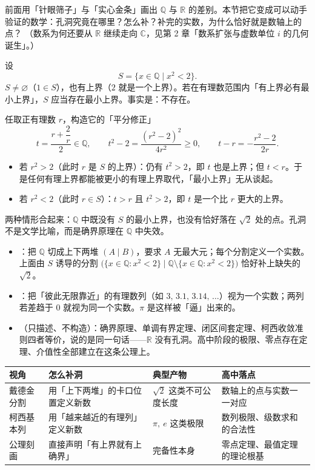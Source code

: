前面用「针眼筛子」与「实心金条」画出 $\mathbb{Q}$ 与 $\mathbb{R}$ 的差别。本节把它变成可以动手验证的数学：孔洞究竟在哪里？怎么补？补完的实数，为什么恰好就是数轴上的点？
（数系为何还要从 $\mathbb{R}$ 继续走向 $\mathbb{C}$，见第 2 章「数系扩张与虚数单位 $i$ 的几何诞生」。）

设
\[
  S=\{x\in\mathbb{Q}\mid x^2<2\}.
\]
$S\neq\varnothing$（$1\in S$），也有上界（$2$ 就是一个上界）。若在有理数范围内「有上界必有最小上界」，$S$ 应当存在最小上界。事实是：不存在。

\begin{derivation}
任取正有理数 $r$，构造它的「平分修正」
\[
  t=\frac{r+\dfrac{2}{r}}{2}\in\mathbb{Q},\qquad
  t^2-2=\frac{(r^2-2)^2}{4r^2}\geq0,\qquad
  t-r=-\frac{r^2-2}{2r}.
\]
\begin{itemize}
  \item 若 $r^2>2$（此时 $r$ 是 $S$ 的上界）：仍有 $t^2>2$，即 $t$ 也是上界；但 $t<r$。于是任何有理上界都能被更小的有理上界取代，「最小上界」无从谈起。
  \item 若 $r^2<2$（此时 $r\in S$）：$t>r$ 且 $t^2>2$，即 $t$ 是一个比 $r$ 更大的上界。
\end{itemize}
两种情形合起来：$\mathbb{Q}$ 中既没有 $S$ 的最小上界，也没有恰好落在 $\sqrt2$ 处的点。孔洞不是文学比喻，而是确界原理在 $\mathbb{Q}$ 中失效。
\end{derivation}

\begin{itemize}
  \item {}：把 $\mathbb{Q}$ 切成上下两堆 $(A\mid B)$，要求 $A$ 无最大元；每个分割定义一个实数。上面由 $S$ 诱导的分割 $\bigl(\{x\in\mathbb{Q}:x^2<2\}\mid\mathbb{Q}\setminus\{x\in\mathbb{Q}:x^2<2\}\bigr)$ 恰好补上缺失的 $\sqrt2$。
  \item {}：把「彼此无限靠近」的有理数列（如 $3,\,3.1,\,3.14,\,\dots$）视为一个实数；两列若差趋于 $0$ 就视为同一个实数。$\pi$ 是这样被「逼」出来的。
  \item {}（只描述、不构造）：确界原理、单调有界定理、闭区间套定理、柯西收敛准则四者等价，说的是同一句话——$\mathbb{R}$ 没有孔洞。高中阶段的极限、零点存在定理、介值性全部建立在这条公理上。
\end{itemize}

\begin{center}
\footnotesize
\setlength{\tabcolsep}{3pt}
\renewcommand{\arraystretch}{1.4}
\begin{tabular}{p{2.4cm}p{3.6cm}p{3.0cm}p{3.8cm}}
\toprule
视角 & 怎么补洞 & 典型产物 & 高中落点 \\
\midrule
戴德金分割 & 用「上下两堆」的卡口位置定义新数 & $\sqrt2$ 这类不可公度长度 & 数轴上的点与实数一一对应 \\
柯西基本列 & 用「越来越近的有理列」定义新数 & $\pi,\ e$ 这类极限 & 数列极限、级数求和的合法性 \\
公理刻画 & 直接声明「有上界就有上确界」 & 完备性本身 & 零点定理、最值定理的理论根基 \\
\bottomrule
\end{tabular}
\end{center}

